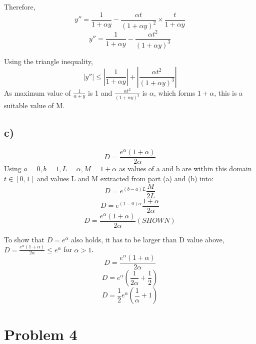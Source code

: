 \documentclass{article}
\begin{document}
Therefore,
\begin{equation*}
    y''=\frac{1}{1+\alpha y}-\frac{\alpha t}{(1+\alpha y)^2}\times \frac{t}{1+\alpha y}
\end{equation*}
\begin{equation*}
    y''=\frac{1}{1+\alpha y}-\frac{\alpha t^2}{(1+\alpha y)^3}
\end{equation*}

Using the triangle inequality, 
\begin{equation*}
    |y''| \leq \left| \frac{1}{1+\alpha y}\right| + \left| \frac{\alpha t^2}{(1+\alpha y)^3}\right|
\end{equation*}
As maximum value of $\frac{1}{\alpha+y}$ is 1 and $\frac{\alpha t^2}{(1+\alpha y)^3}$ is $\alpha$, which forms $1+\alpha$, this is a suitable value of M. 

\subsection*{c)}
\begin{equation*}
    D=\frac{e^\alpha (1+\alpha)}{2\alpha}
\end{equation*}
Using $a=0, b=1, L=\alpha, M=1+\alpha$ as values of a and b are within this domain $t\in[0,1]$ and values L and M extracted from part (a) and (b) into:
\begin{equation*}
    D=e^{(b-a)L}\frac{M}{2L}
\end{equation*}
\begin{equation*}
    D=e^{(1-0)\alpha}\frac{1+\alpha}{2\alpha}
\end{equation*}
\begin{equation*}
    D=\frac{e^\alpha (1+\alpha)}{2\alpha} (SHOWN)
\end{equation*}

To show that $D=e^{\alpha}$ also holds, it has to be larger than D value above, $D=\frac{e^\alpha (1+\alpha)}{2\alpha} \leq e^\alpha$ for $\alpha>1$.
\begin{equation*}
    D=\frac{e^\alpha (1+\alpha)}{2\alpha} 
\end{equation*}
\begin{equation*}
    D=e^{\alpha}\left(\frac{1}{2\alpha}+\frac{1}{2}\right)
\end{equation*}
\begin{equation*}
    D=\frac{1}{2}e^{\alpha}\left(\frac{1}{\alpha}+1\right)
\end{equation*}

\section{Problem 4}
\end{document}
